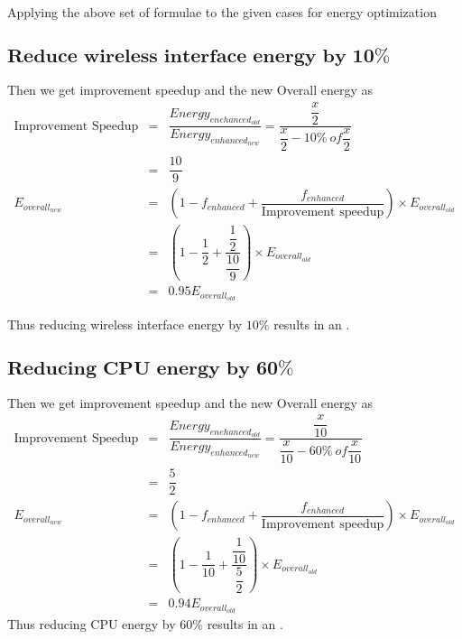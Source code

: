 \documentclass{tufte-handout}
\begin{document}
	  Applying the above set of formulae to the given cases for energy optimization

	  \subsection{$\textbf{Reduce wireless interface energy by 10\%}$}
	  	Then we get improvement speedup and the new Overall energy as
		\begin{eqnarray*}
			\mbox{Improvement Speedup} &=& \dfrac{Energy_{enehanced_{old}}}{Energy_{enhanced_{new}}} = \dfrac{\dfrac{x}{2}}{\dfrac{x}{2} - 10\%\ of \dfrac{x}{2}}\\
			&=& \dfrac{10}{9} \\
			E_{overall_{new}} &=& (1 - f_{enhanced} + \dfrac{f_{enhanced}}{\mbox{Improvement speedup}}) \times E_{overall_{old}} \\
			&=& ( 1 - \dfrac{1}{2} + \dfrac{\dfrac{1}{2}}{\dfrac{10}{9}})\times E_{overall_{old}} \\
			&=& 0.95 E_{overall_{old}}
		\end{eqnarray*}

		Thus reducing wireless interface energy by $10\%$ results in an .

	  \subsection{$\textbf{Reducing CPU energy by 60\%}$}
	  	Then we get improvement speedup and the new Overall energy as
		\begin{eqnarray*}
			\mbox{Improvement Speedup} &=& \dfrac{Energy_{enehanced_{old}}}{Energy_{enhanced_{new}}} = \dfrac{\dfrac{x}{10}}{\dfrac{x}{10} - 60\%\ of \dfrac{x}{10}}\\
			&=& \dfrac{5}{2} \\
			E_{overall_{new}} &=& (1 - f_{enhanced} + \dfrac{f_{enhanced}}{\mbox{Improvement speedup}}) \times E_{overall_{old}} \\
			&=& ( 1 - \dfrac{1}{10} + \dfrac{\dfrac{1}{10}}{\dfrac{5}{2}})\times E_{overall_{old}} \\
			&=& 0.94 E_{overall_{old}}
		\end{eqnarray*}
		Thus reducing CPU energy by $60\%$ results in an .
\end{document}
